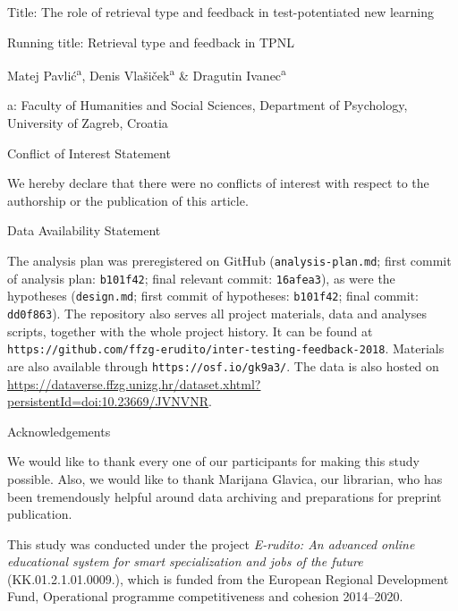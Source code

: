 \documentclass[12pt]{article}
\begin{document}
\begin{titlepage}
    \begin{center}

        \vspace*{\fill}

        Title: The role of retrieval type and feedback in 
        test-potentiated new learning
        
        Running title: Retrieval type and feedback in TPNL

        \bigskip
        Matej Pavlić\textsuperscript{a}, Denis Vlašiček\textsuperscript{a} 
        \& Dragutin Ivanec\textsuperscript{a}

        a: Faculty of Humanities and Social Sciences, Department of 
        Psychology, University of Zagreb, Croatia

        \bigskip
		\bigskip
		\bigskip

	    \end{center}
		
		{\centering
			Conflict of Interest Statement\par}
		We hereby declare that there were no conflicts of 
		interest with respect to the authorship or the 
		publication of this article.
		
		\bigskip
		
		{\centering
		Data Availability Statement\par}

		The analysis plan was preregistered on GitHub 
		(\texttt{analysis-plan.md};
		first commit of analysis plan: \texttt{b101f42}; 
		final relevant commit:
		\texttt{16afea3}), as were the hypotheses 
		(\texttt{design.md}; first commit of hypotheses:
		\texttt{b101f42}; final commit: \texttt{dd0f863}).  
		The repository also serves all
		project materials, data and analyses scripts, 
		together with the whole project
		history. It can be found at
		\texttt{https://github.com/ffzg-erudito/inter-testing-feedback-2018}.
		Materials are also available through 
		\texttt{https://osf.io/gk9a3/}. The data
		is also hosted on
		\url{https://dataverse.ffzg.unizg.hr/dataset.xhtml?persistentId=doi:10.23669/JVNVNR}.

		\bigskip
		
		{\centering
			Acknowledgements\par}
		
		We would like to thank every one of our 
		participants for making this study
		possible. Also, we would like to thank Marijana 
		Glavica, our librarian,
		who has been tremendously helpful around data 
		archiving and preparations
		for preprint publication.	
		
                This study was conducted under the project \textit{E-rudito: An
                advanced online educational system for smart specialization and
                jobs of the future} (KK.01.2.1.01.0009.), which is funded from the
                European Regional Development Fund, Operational programme
                competitiveness and cohesion 2014--2020.
		
        \vspace*{\fill}

 

\end{titlepage}
\end{document}
